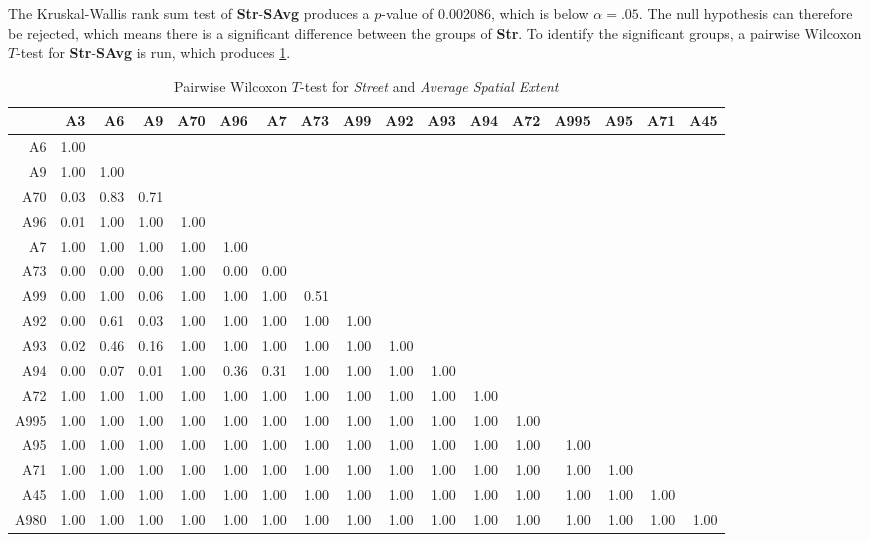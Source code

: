 The Kruskal-Wallis rank sum test of \textbf{Str}-\textbf{SAvg} produces a $p$-value of 0.002086, which is below $\alpha=.05$. The null hypothesis can therefore be rejected, which means there is a significant difference between the groups of \textbf{Str}. To identify the significant groups, a pairwise Wilcoxon $T$-test for \textbf{Str}-\textbf{SAvg} is run, which produces \cref{tbl:wilcoxon_baysis_matched_Str_SAvg}.
\begin{table}[ht!]
	\tiny
	\setlength{\tabcolsep}{4pt}
	\centering
	\begin{tabular}{rrrrrrrrrrrrrrrrr}
		\toprule
	 		 & A3 & A6 & A9 & A70 & A96 & A7 & A73 & A99 & A92 & A93 & A94 & A72 & A995 & A95 & A71 & A45 \\ 
		\midrule
		A6   & 1.00 &  &  &  &  &  &  &  &  &  &  &  &  &  &  &  \\ 
	  	A9   & 1.00 & 1.00 &  &  &  &  &  &  &  &  &  &  &  &  &  &  \\ 
	  	A70  & 0.03 & 0.83 & 0.71 &  &  &  &  &  &  &  &  &  &  &  &  &  \\ 
	  	A96  & 0.01 & 1.00 & 1.00 & 1.00 &  &  &  &  &  &  &  &  &  &  &  &  \\ 
	  	A7   & 1.00 & 1.00 & 1.00 & 1.00 & 1.00 &  &  &  &  &  &  &  &  &  &  &  \\ 
	  	A73  & 0.00 & 0.00 & 0.00 & 1.00 & 0.00 & 0.00 &  &  &  &  &  &  &  &  &  &  \\ 
	  	A99  & 0.00 & 1.00 & 0.06 & 1.00 & 1.00 & 1.00 & 0.51 &  &  &  &  &  &  &  &  &  \\ 
	  	A92  & 0.00 & 0.61 & 0.03 & 1.00 & 1.00 & 1.00 & 1.00 & 1.00 &  &  &  &  &  &  &  &  \\ 
	  	A93  & 0.02 & 0.46 & 0.16 & 1.00 & 1.00 & 1.00 & 1.00 & 1.00 & 1.00 &  &  &  &  &  &  &  \\ 
	  	A94  & 0.00 & 0.07 & 0.01 & 1.00 & 0.36 & 0.31 & 1.00 & 1.00 & 1.00 & 1.00 &  &  &  &  &  &  \\ 
	  	A72  & 1.00 & 1.00 & 1.00 & 1.00 & 1.00 & 1.00 & 1.00 & 1.00 & 1.00 & 1.00 & 1.00 &  &  &  &  &  \\ 
	  	A995 & 1.00 & 1.00 & 1.00 & 1.00 & 1.00 & 1.00 & 1.00 & 1.00 & 1.00 & 1.00 & 1.00 & 1.00 &  &  &  &  \\ 
	  	A95  & 1.00 & 1.00 & 1.00 & 1.00 & 1.00 & 1.00 & 1.00 & 1.00 & 1.00 & 1.00 & 1.00 & 1.00 & 1.00 &  &  &  \\ 
	  	A71  & 1.00 & 1.00 & 1.00 & 1.00 & 1.00 & 1.00 & 1.00 & 1.00 & 1.00 & 1.00 & 1.00 & 1.00 & 1.00 & 1.00 &  &  \\ 
	  	A45  & 1.00 & 1.00 & 1.00 & 1.00 & 1.00 & 1.00 & 1.00 & 1.00 & 1.00 & 1.00 & 1.00 & 1.00 & 1.00 & 1.00 & 1.00 &  \\ 
	  	A980 & 1.00 & 1.00 & 1.00 & 1.00 & 1.00 & 1.00 & 1.00 & 1.00 & 1.00 & 1.00 & 1.00 & 1.00 & 1.00 & 1.00 & 1.00 & 1.00 \\ 
		\bottomrule
	\end{tabular}
	\caption{Pairwise Wilcoxon $T$-test for \textit{Street} and \textit{Average Spatial Extent}}
	\label{tbl:wilcoxon_baysis_matched_Str_SAvg}
\end{table}
